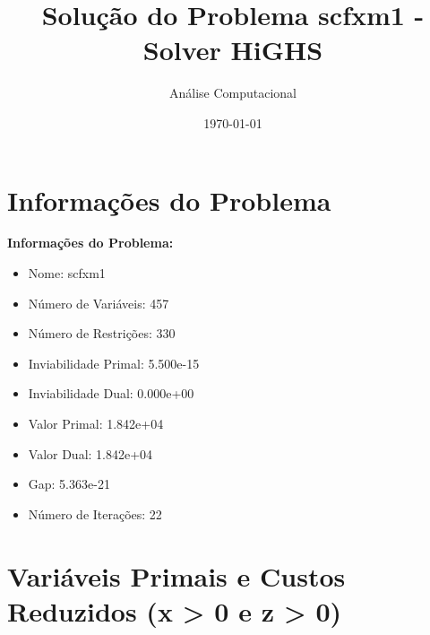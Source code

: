 \documentclass[12pt]{article}
\title{Solução do Problema scfxm1 - Solver HiGHS}
\author{Análise Computacional}
\date{\today}
\begin{document}
\maketitle

\section{Informações do Problema}

\textbf{Informações do Problema:}
\begin{itemize}
\item Nome: scfxm1
\item Número de Variáveis: 457
\item Número de Restrições: 330
\item Inviabilidade Primal: 5.500e-15
\item Inviabilidade Dual: 0.000e+00
\item Valor Primal: 1.842e+04
\item Valor Dual: 1.842e+04
\item Gap: 5.363e-21
\item Número de Iterações: 22
\end{itemize}


\section{Variáveis Primais e Custos Reduzidos (x > 0 e z > 0)}
\end{document}
